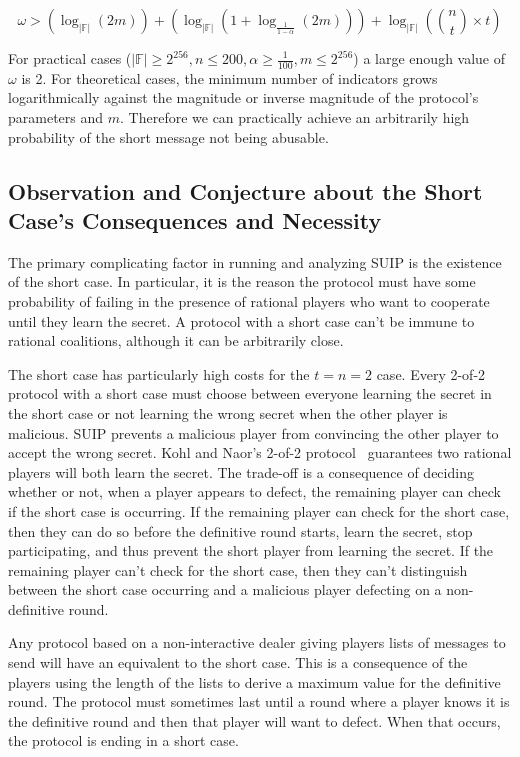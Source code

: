 \documentclass[12pt]{dalcsthesis}
\begin{document}
$$\omega > \left(\log_{|\mathbb{F}|} (2 m)\right) + \left(\log_{|\mathbb{F}|} \left(1 + \log_{\frac{1}{1-\alpha}}(2 m)\right)\right) + \log_{|\mathbb{F}|} \left(\binom{n}{t} \times t\right)$$

For practical cases ($|\mathbb{F}| \geq 2^{256}, n \leq 200, \alpha \geq \frac{1}{100}, m \leq 2^{256}$) a large enough value of $\omega$ is 2. For theoretical cases, the minimum number of indicators grows logarithmically against the magnitude or inverse magnitude of the protocol's parameters and $m$. Therefore we can practically achieve an arbitrarily high probability of the short message not being abusable.

\subsection{Observation and Conjecture about the Short Case's Consequences and Necessity}

The primary complicating factor in running and analyzing SUIP is the existence of the short case. In particular, it is the reason the protocol must have some probability of failing in the presence of rational players who want to cooperate until they learn the secret. A protocol with a short case can't be immune to rational coalitions, although it can be arbitrarily close.

The short case has particularly high costs for the $t=n=2$ case. Every 2-of-2 protocol with a short case must choose between everyone learning the secret in the short case or not learning the wrong secret when the other player is malicious. SUIP prevents a malicious player from convincing the other player to accept the wrong secret. Kohl and Naor's 2-of-2 protocol~\cite{kol08} guarantees two rational players will both learn the secret. The trade-off is a consequence of deciding whether or not, when a player appears to defect, the remaining player can check if the short case is occurring. If the remaining player can check for the short case, then they can do so before the definitive round starts, learn the secret, stop participating, and thus prevent the short player from learning the secret. If the remaining player can't check for the short case, then they can't distinguish between the short case occurring and a malicious player defecting on a non-definitive round.

Any protocol based on a non-interactive dealer giving players lists of messages to send will have an equivalent to the short case. This is a consequence of the players using the length of the lists to derive a maximum value for the definitive round. The protocol must sometimes last until a round where a player knows it is the definitive round and then that player will want to defect. When that occurs, the protocol is ending in a short case.
\end{document}
